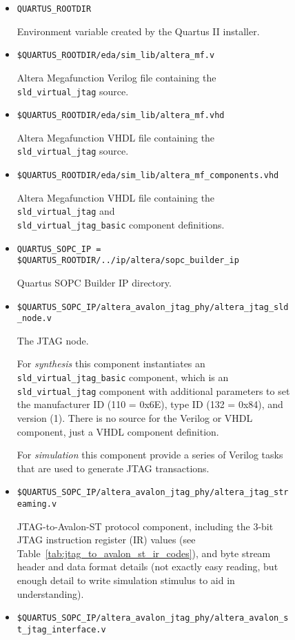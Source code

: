 \documentclass[10pt,twoside]{article}
\begin{document}
\begin{figure}[p]
\begin{minipage}{\textwidth}
\begin{itemize}
\item \verb+QUARTUS_ROOTDIR+

Environment variable created by the Quartus II installer.
%
\item \verb+$QUARTUS_ROOTDIR/eda/sim_lib/altera_mf.v+

Altera Megafunction Verilog file containing the \verb+sld_virtual_jtag+ source.
%
\item \verb+$QUARTUS_ROOTDIR/eda/sim_lib/altera_mf.vhd+ 

Altera Megafunction VHDL file containing the \verb+sld_virtual_jtag+ source.
%
\item \verb+$QUARTUS_ROOTDIR/eda/sim_lib/altera_mf_components.vhd+ 

Altera Megafunction VHDL file containing the \verb+sld_virtual_jtag+ and\\ \verb+sld_virtual_jtag_basic+ component definitions.
%
\item \verb+QUARTUS_SOPC_IP = $QUARTUS_ROOTDIR/../ip/altera/sopc_builder_ip+

Quartus SOPC Builder IP directory.
%
\item \verb+$QUARTUS_SOPC_IP/altera_avalon_jtag_phy/altera_jtag_sld_node.v+ 

The JTAG node. 

For {\em synthesis} this component instantiates
an \verb+sld_virtual_jtag_basic+ component, which is
an \verb+sld_virtual_jtag+ component with additional parameters to set the
manufacturer ID (110 = 0x6E), type ID (132 = 0x84), and version (1). 
There is no source for the Verilog or VHDL component, just a VHDL 
component definition.

For {\em simulation} this component provide a series of Verilog tasks
that are used to generate JTAG transactions.
%
\item \verb+$QUARTUS_SOPC_IP/altera_avalon_jtag_phy/altera_jtag_streaming.v+ 

JTAG-to-Avalon-ST protocol component, including the 3-bit JTAG instruction
register (IR) values (see Table~\ref{tab:jtag_to_avalon_st_ir_codes}),
 and byte stream header and data format details
(not exactly easy reading, but enough detail to write simulation stimulus
to aid in understanding). 
%
\item \verb+$QUARTUS_SOPC_IP/altera_avalon_jtag_phy/altera_avalon_st_jtag_interface.v+ 


\end{itemize}
\end{minipage}
\end{figure}
\end{document}
